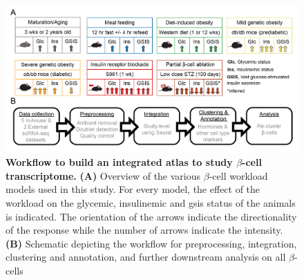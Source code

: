 \begin{figure}[b!]
\centering
\includegraphics[width=\linewidth]{Chapter5/Fig/F3-1-v2-02.png}
\caption[Workflow to build an integrated atlas to study $\beta$-cell transcriptome]{\textbf{Workflow to build an integrated atlas to study $\beta$-cell transcriptome.} \textbf{(A)} Overview of the various $\beta$-cell workload models used in this study. For every model, the effect of the workload on the glycemic, insulinemic and \gls{gsis} status of the animals is indicated. The orientation of the arrows indicate the directionality of the response while the number of arrows indicate the intensity. \textbf{(B)} Schematic depicting the workflow for preprocessing, integration, clustering and annotation, and further downstream analysis on all $\beta$-cells}
\label{fig:chp3_workflow}
\end{figure}

